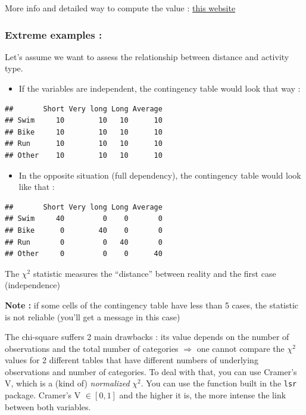 \documentclass[
]{book}
\providecommand{\tightlist}{%
  \setlength{\itemsep}{0pt}\setlength{\parskip}{0pt}}
\begin{document}
More info and detailed way to compute the value : \href{https://www.statisticshowto.com/probability-and-statistics/chi-square/}{this website}

\hypertarget{extreme-examples}{%
\subsubsection{Extreme examples :}\label{extreme-examples}}

Let's assume we want to assess the relationship between distance and activity type.

\begin{itemize}
\tightlist
\item
  If the variables are independent, the contingency table would look that way :
\end{itemize}

\begin{verbatim}
##       Short Very long Long Average
## Swim     10        10   10      10
## Bike     10        10   10      10
## Run      10        10   10      10
## Other    10        10   10      10
\end{verbatim}

\begin{itemize}
\tightlist
\item
  In the opposite situation (full dependency), the contingency table would look like that :
\end{itemize}

\begin{verbatim}
##       Short Very long Long Average
## Swim     40         0    0       0
## Bike      0        40    0       0
## Run       0         0   40       0
## Other     0         0    0      40
\end{verbatim}

The \(\chi^2\) statistic measures the ``distance'' between reality and the first case (independence)

\textbf{Note :} if some cells of the contingency table have less than 5 cases, the statistic is not reliable (you'll get a message in this case)

The chi-square suffers 2 main drawbacks : its value depends on the number of observations and the total number of categories \(\Rightarrow\) one cannot compare the \(\chi^2\) values for 2 different tables that have different numbers of underlying observations and number of categories.
To deal with that, you can use Cramer's V, which is a (kind of) \emph{normalized} \(\chi^2\). You can use the function built in the \texttt{lsr} package. Cramer's V \(\in [0,1]\) and the higher it is, the more intense the link between both variables.
\end{document}
